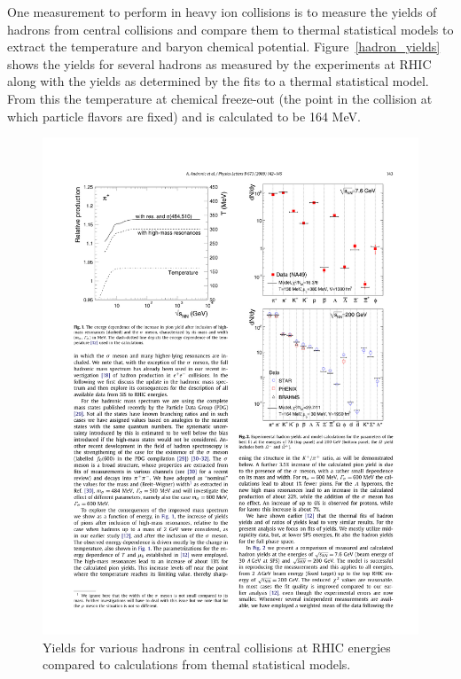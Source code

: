 One measurement to perform in heavy ion collisions is to measure the yields of hadrons from central collisions and compare them to thermal statistical models to extract the temperature and baryon chemical potential. Figure~\ref{hadron_yields} shows the yields for several hadrons as measured by the experiments at RHIC along with the yields as determined by the fits to a thermal statistical model. From this the temperature at chemical freeze-out (the point in the collision at which particle flavors are fixed) and is calculated to be 164 MeV.

\begin{figure}[htbp]
\begin{center}
\includegraphics[scale=1.2]{Plots/Intro/had_yields.pdf}
\end{center}
\caption[Hadron Yields]{Yields for various hadrons in central collisions at RHIC energies compared to calculations from themal statistical models.}
\label{fig:hadron_yields}
\end{figure}

